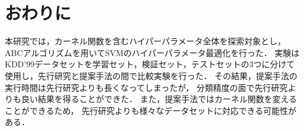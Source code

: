 \section{おわりに}
本研究では，カーネル関数を含むハイパーパラメータ全体を探索対象とし，
ABCアルゴリズムを用いてSVMのハイパーパラメータ最適化を行った．
実験はKDD'99データセットを学習セット，検証セット，テストセットの3つに分けて
使用し，先行研究と提案手法の間で比較実験を行った．
その結果，提案手法の実行時間は先行研究よりも長くなってしまったが，
分類精度の面で先行研究よりも良い結果を得ることができた．
また，提案手法ではカーネル関数を変えることができるため，
先行研究よりも様々なデータセットに対応できる可能性がある．




